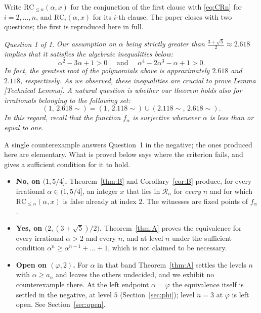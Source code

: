 \documentclass[11pt]{amsart}
\theoremstyle{remark}
\newtheorem*{question}{Question 1 of \cite{KVZ}}
\newcommand{\RC}{\mathrm{RC}}
\begin{document}
\noindent
Write $\RC_{\le n}(\alpha,x)$ for the conjunction of the first clause with
\eqref{eq:CRn} for $i=2,\dots,n$, and $\RC_i(\alpha,x)$ for its $i$-th clause. The paper
\cite{KVZ} closes with two questions; the first is reproduced here in full.

\begin{question}
\emph{Our assumption on $\alpha$ being strictly greater than
$\frac{3+\sqrt5}{2}\approx2.618$ implies that it satisfies the algebraic inequalities
below:
\[
 \alpha^{2}-3\alpha+1>0\quad\text{ and }\quad\alpha^{4}-2\alpha^{3}-\alpha+1>0.
\]
In fact, the greatest root of the polynomials above is approximately $2.618$ and
$2.118$, respectively. As we observed, these inequalities are crucial to prove Lemma
\textup{[}Technical Lemma\textup{]}. A natural question is whether our theorem holds also
for irrationals belonging to the following set:
\[
 (1,\,2.618\!\sim)=(1,\,2.118\!\sim)\cup(2.118\!\sim,\,2.618\!\sim).
\]
In this regard, recall that the function $f_\alpha$ is surjective whenever $\alpha$ is
less than or equal to one.}
\end{question}

\noindent
A single counterexample answers Question~1 in the negative; the ones produced here are
elementary. What is proved below says where the criterion fails, and gives a sufficient
condition for it to hold.

\begin{itemize}
\item \textbf{No, on $(1,5/4]$.} Theorem~\ref{thm:B} and Corollary~\ref{cor:B} produce,
 for every irrational $\alpha\in(1,5/4]$, an integer $x$ that lies in $\mathcal R_n$ for
 \emph{every} $n$ and for which $\RC_{\le n}(\alpha,x)$ is false already at index $2$.
 The witnesses are fixed points of $f_\alpha$.
\item \textbf{Yes, on $\bigl(2,(3+\sqrt5)/2\bigr)$.} Theorem~\ref{thm:A} proves the
 equivalence for every irrational $\alpha>2$ and every $n$, and at level $n$ under the
 sufficient condition $\alpha^{n}\ge\alpha^{n-1}+\dots+1$, which is not claimed to be
 necessary.
\item \textbf{Open on $(\varphi,2)$.} For $\alpha$ in that band Theorem~\ref{thm:A}
 settles the levels $n$ with $\alpha\ge a_n$ and leaves the others undecided, and we
 exhibit no counterexample there. At the left endpoint $\alpha=\varphi$ the equivalence
 itself is settled in the negative, at level $5$ (Section~\ref{sec:phi}); level $n=3$ at
 $\varphi$ is left open. See Section~\ref{sec:open}.
\end{itemize}
\end{document}
